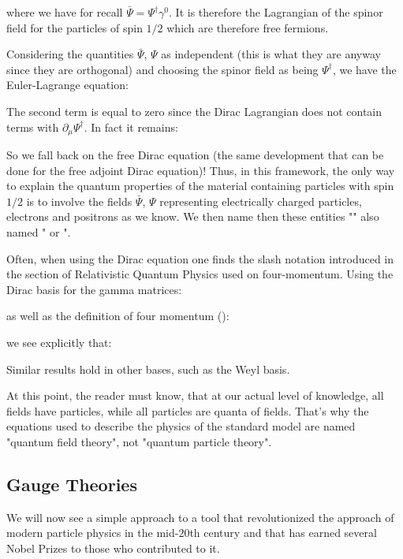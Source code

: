 	where we have for recall $\bar{\Psi}=\Psi^\dagger \gamma^0$. It is therefore the Lagrangian of the spinor field for the particles of spin $1/2$ which are therefore free fermions.

	Considering the quantities $\bar{\Psi}$, $\Psi$ as independent (this is what they are anyway since they are orthogonal) and choosing the spinor field as being $\Psi^\dagger$, we have the Euler-Lagrange equation:
	
	The second term is equal to zero since the Dirac Lagrangian does not contain terms with $\partial_\mu\Psi^\dagger$. In fact it remains:
	
	So we fall back on the free Dirac equation (the same development that can be done for the free adjoint Dirac equation)! Thus, in this framework, the only way to explain the quantum properties of the material containing particles with spin $1/2$ is to involve the fields $\bar{\Psi}$, $\Psi$ representing electrically charged particles, electrons and positrons as we know. We then name then these entities "" also named " or ".

	\begin{tcolorbox}[title=Remark,colframe=black,arc=10pt]
	Often, when using the Dirac equation one finds the slash notation introduced in the section of Relativistic Quantum Physics used on four-momentum. Using the Dirac basis for the gamma matrices:
	
	as well as the definition of four momentum ():
	
	we see explicitly that:
	
	Similar results hold in other bases, such as the Weyl basis.
	\end{tcolorbox}
	At this point, the reader must know, that at our actual level of knowledge, all fields have particles, while all particles are quanta of fields. That's why the equations used to describe the physics of the standard model are named "quantum field theory", not "quantum particle theory".
	
	\subsection{Gauge Theories}
	We will now see a simple approach to a tool that revolutionized the approach of modern particle physics in the mid-$20$th century and that has earned several Nobel Prizes to those who contributed to it.

